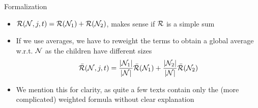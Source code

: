 \documentclass[11pt,compress,t,notes=noshow, xcolor=table]{beamer}
\begin{document}
\begin{vbframe}{Formalization}
\framebreak
\begin{itemize}

\item $\mathcal{R}(\mathcal{N}, j, t) =  \mathcal{R}(\mathcal{N}_1) +  \mathcal{R}(\mathcal{N}_2)$, makes sense if $\mathcal{R}$ is a simple sum
\item If we use averages, we have to reweight the terms to obtain a global average w.r.t. $\mathcal{N}$ as the children have different sizes
     \begin{align*}
      \bar{\mathcal{R}}(\mathcal{N}, j, t) &= \frac{|\mathcal{N}_1|}{|\mathcal{N}|} \bar{\mathcal{R}}(\mathcal{N}_1) + \frac{|\mathcal{N}_2|}{|\mathcal{N}|} \bar{\mathcal{R}}(\mathcal{N}_2) \\
      \end{align*}
\item We mention this for clarity, as quite a few texts contain only the (more complicated) weighted formula without clear explanation

\end{itemize}
\end{vbframe}



\endlecture
\end{document}
